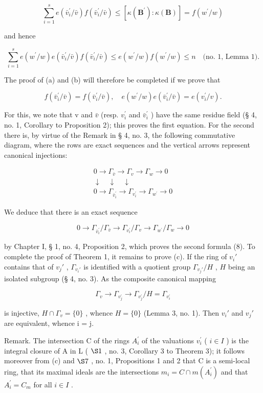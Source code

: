 \[
\sum_ {i = 1} ^ {s} e \left(\bar {v} _ {i} ^ {\prime} / \bar {v}\right) f \left(\bar {v} _ {i} ^ {\prime} / \bar {v}\right) \leqslant \left[ \kappa \left(\mathbf {B} ^ {\prime}\right): \kappa (\mathbf {B}) \right] = f \left(w ^ {\prime} / w\right)
\]

and hence

\[
\sum_ {i = 1} ^ {s} e (w ^ {\prime} / w) e (\bar {v} _ {i} ^ {\prime} / \bar {v}) f (\bar {v} _ {i} ^ {\prime} / \bar {v}) \leqslant e (w ^ {\prime} / w) f (w ^ {\prime} / w) \leqslant n \quad \text {(no. 1, Lemma 1)}.
\]

The proof of (a) and (b) will therefore be completed if we prove that

\[
f (\bar {v} _ {i} ^ {\prime} / \bar {v}) = f (\bar {v} _ {i} ^ {\prime} / \bar {v}), \quad e (w ^ {\prime} / w) e (\bar {v} _ {i} ^ {\prime} / \bar {v}) = e (v _ {i} ^ {\prime} / v).\tag{8}
\]

For this, we note that v and \(\bar{v}\) (resp. \(v_{i}^{\prime}\) and \(\bar{v}_{i}^{\prime}\) ) have the same residue field (§ 4, no. 1, Corollary to Proposition 2); this proves the first equation. For the second there is, by virtue of the Remark in § 4, no. 3, the following commutative diagram, where the rows are exact sequences and the vertical arrows represent canonical injections:

\[
\begin{array}{c} 0 \to \Gamma_ {\bar {v}} \to \Gamma_ {v} \to \Gamma_ {w} \to 0 \\ \downarrow \quad \downarrow \quad \downarrow \\ 0 \to \Gamma_ {\bar {v} _ {i} ^ {\prime}} \to \Gamma_ {v _ {i} ^ {\prime}} \to \Gamma_ {w ^ {\prime}} \to 0 \end{array}
\]

We deduce that there is an exact sequence

\[
0 \rightarrow \Gamma_ {\bar {v} _ {i} ^ {\prime}} / \Gamma_ {\bar {v}} \rightarrow \Gamma_ {v _ {i} ^ {\prime}} / \Gamma_ {v} \rightarrow \Gamma_ {w ^ {\prime}} / \Gamma_ {w} \rightarrow 0
\]

by Chapter I, § 1, no. 4, Proposition 2, which proves the second formula (8). To complete the proof of Theorem 1, it remains to prove (c). If the ring of \(v_i'\) contains that of \(v_j'\) , \(\Gamma_{v_i'}\) is identified with a quotient group \(\Gamma_{v_j'} / H\) , \(H\) being an isolated subgroup (§ 4, no. 3). As the composite canonical mapping

\[
\Gamma_ {v} \rightarrow \Gamma_ {v _ {j} ^ {\prime}} \rightarrow \Gamma_ {v _ {j} ^ {\prime}} / H = \Gamma_ {v _ {i} ^ {\prime}}
\]

is injective, \(H \cap \Gamma_{v} = \{0\}\) , whence \(H = \{0\}\) (Lemma 3, no. 1). Then \(v_{i}'\) and \(v_{j}'\) are equivalent, whence i = j.

Remark. The intersection C of the rings \(A_{i}^{\prime}\) of the valuations \(v_{i}^{\prime}\) ( \(i \in I\) ) is the integral closure of A in L ( \(\S 1\) , no. 3, Corollary 3 to Theorem 3); it follows moreover from (c) and \(\S 7\) , no. 1, Propositions 1 and 2 that C is a semi-local ring, that its maximal ideals are the intersections \(m_{i} = C \cap m(A_{i}^{\prime})\) and that \(A_{i}^{\prime} = C_{m}\) for all \(i \in I\) .

